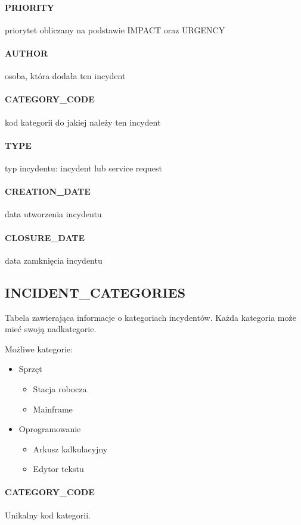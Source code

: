 \documentclass[a4paper, oneside, 11pt]{report}
\begin{document}
\paragraph{PRIORITY} priorytet obliczany na podstawie IMPACT oraz URGENCY
\paragraph{AUTHOR} osoba, która dodała ten incydent
\paragraph{CATEGORY\_CODE} kod kategorii do jakiej należy ten incydent
\paragraph{TYPE} typ incydentu: incydent lub service request
\paragraph{CREATION\_DATE} data utworzenia incydentu
\paragraph{CLOSURE\_DATE} data zamknięcia incydentu

\subsection{INCIDENT\_CATEGORIES}

Tabela zawierająca informacje o kategoriach incydentów. Każda kategoria może mieć swoją nadkategorie.

Możliwe kategorie:

\begin{itemize}
 \item Sprzęt
      \begin{itemize}
	\item Stacja robocza
	\item Mainframe
       \end{itemize}
 \item Oprogramowanie
      \begin{itemize}
	\item Arkusz kalkulacyjny
	\item Edytor tekstu
       \end{itemize}
\end{itemize}

\paragraph{CATEGORY\_CODE} Unikalny kod kategorii.
\end{document}
